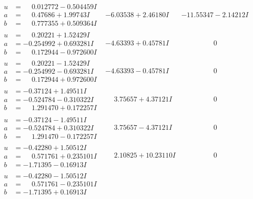 \documentclass[1p]{elsarticle_modified}
\theoremstyle{definition}
\begin{document}
$$\begin{array}{c|c|c}
\begin{aligned}
u &= \phantom{-}0.012772 - 0.504459 I \\
a &= \phantom{-}0.47686 + 1.99743 I \\
b &= \phantom{-}0.777355 + 0.509364 I\end{aligned}
 & -6.03538 + 2.46180 I & -11.55347 - 2.14212 I \\ \hline\begin{aligned}
u &= \phantom{-}0.20221 + 1.52429 I \\
a &= -0.254992 + 0.693281 I \\
b &= \phantom{-}0.172944 - 0.972600 I\end{aligned}
 & -4.63393 + 0.45781 I & \phantom{-0.000000 } 0 \\ \hline\begin{aligned}
u &= \phantom{-}0.20221 - 1.52429 I \\
a &= -0.254992 - 0.693281 I \\
b &= \phantom{-}0.172944 + 0.972600 I\end{aligned}
 & -4.63393 - 0.45781 I & \phantom{-0.000000 } 0 \\ \hline\begin{aligned}
u &= -0.37124 + 1.49511 I \\
a &= -0.524784 - 0.310322 I \\
b &= \phantom{-}1.291470 + 0.172257 I\end{aligned}
 & \phantom{-}3.75657 + 4.37121 I & \phantom{-0.000000 } 0 \\ \hline\begin{aligned}
u &= -0.37124 - 1.49511 I \\
a &= -0.524784 + 0.310322 I \\
b &= \phantom{-}1.291470 - 0.172257 I\end{aligned}
 & \phantom{-}3.75657 - 4.37121 I & \phantom{-0.000000 } 0 \\ \hline\begin{aligned}
u &= -0.42280 + 1.50512 I \\
a &= \phantom{-}0.571761 + 0.235101 I \\
b &= -1.71395 - 0.16913 I\end{aligned}
 & \phantom{-}2.10825 + 10.23110 I & \phantom{-0.000000 } 0 \\ \hline\begin{aligned}
u &= -0.42280 - 1.50512 I \\
a &= \phantom{-}0.571761 - 0.235101 I \\
b &= -1.71395 + 0.16913 I\end{aligned}

\end{array}$$
\end{document}
